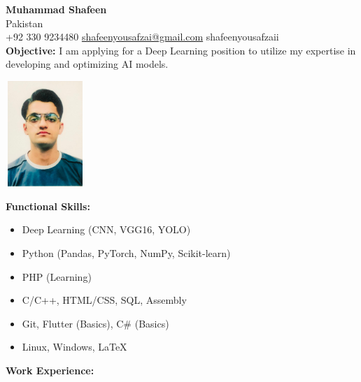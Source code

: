 \documentclass[a4paper,10pt]{article}
\begin{document}
\begin{minipage}[t]{0.68\textwidth}
    {\LARGE \textbf{Muhammad Shafeen}}\\
    Pakistan\\
    +92 330 9234480 \textbar{} \href{mailto:shafeenyousafzai@gmail.com}{shafeenyousafzai@gmail.com} \textbar{} shafeenyousafzaii\\
    \vspace{5pt}
    \textbf{Objective:} I am applying for a Deep Learning position to utilize my expertise in developing and optimizing AI models.
\end{minipage}
\begin{minipage}[t]{0.28\textwidth}
    \begin{flushright}
        \includegraphics[width=3cm,height=4cm]{WhatsApp Image 2024-09-13 at 14.26.56_2044906e.jpg} %
    \end{flushright}
\end{minipage}

\vspace{10pt}

\textbf{Functional Skills:}
\begin{itemize}
    \item Deep Learning (CNN, VGG16, YOLO)
    \item Python (Pandas, PyTorch, NumPy, Scikit-learn)
    \item PHP (Learning)
    \item C/C++, HTML/CSS, SQL, Assembly
    \item Git, Flutter (Basics), C\# (Basics)
    \item Linux, Windows, LaTeX
\end{itemize}

\vspace{5pt}

\textbf{Work Experience:}

\vspace{5pt}
\end{document}
